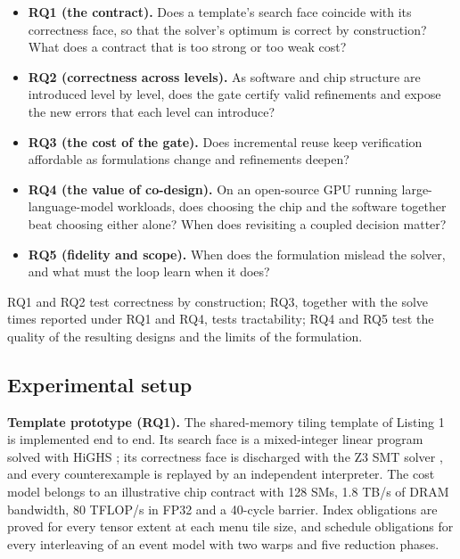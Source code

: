 \documentclass[11pt]{article}
\providecommand{\tightlist}{\setlength{\itemsep}{0pt}\setlength{\parskip}{0pt}}
\begin{document}
\begin{itemize}
\tightlist
\item
  \textbf{RQ1 (the contract).} Does a template's search face coincide with its correctness face, so that the solver's optimum is correct by construction? What does a contract that is too strong or too weak cost?
\item
  \textbf{RQ2 (correctness across levels).} As software and chip structure are introduced level by level, does the gate certify valid refinements and expose the new errors that each level can introduce?
\item
  \textbf{RQ3 (the cost of the gate).} Does incremental reuse keep verification affordable as formulations change and refinements deepen?
\item
  \textbf{RQ4 (the value of co-design).} On an open-source GPU running large-language-model workloads, does choosing the chip and the software together beat choosing either alone? When does revisiting a coupled decision matter?
\item
  \textbf{RQ5 (fidelity and scope).} When does the formulation mislead the solver, and what must the loop learn when it does?
\end{itemize}

RQ1 and RQ2 test correctness by construction; RQ3, together with the solve times reported under RQ1 and RQ4, tests tractability; RQ4 and RQ5 test the quality of the resulting designs and the limits of the formulation.

\hypertarget{experimental-setup}{%
\subsection{Experimental setup}\label{experimental-setup}}

\textbf{Template prototype (RQ1).} The shared-memory tiling template of Listing 1 is implemented end to end. Its search face is a mixed-integer linear program solved with HiGHS \cite{r91}; its correctness face is discharged with the Z3 SMT solver \cite{r90}, and every counterexample is replayed by an independent interpreter. The cost model belongs to an illustrative chip contract with 128 SMs, 1.8 TB/s of DRAM bandwidth, 80 TFLOP/s in FP32 and a 40-cycle barrier. Index obligations are proved for every tensor extent at each menu tile size, and schedule obligations for every interleaving of an event model with two warps and five reduction phases.
\end{document}
